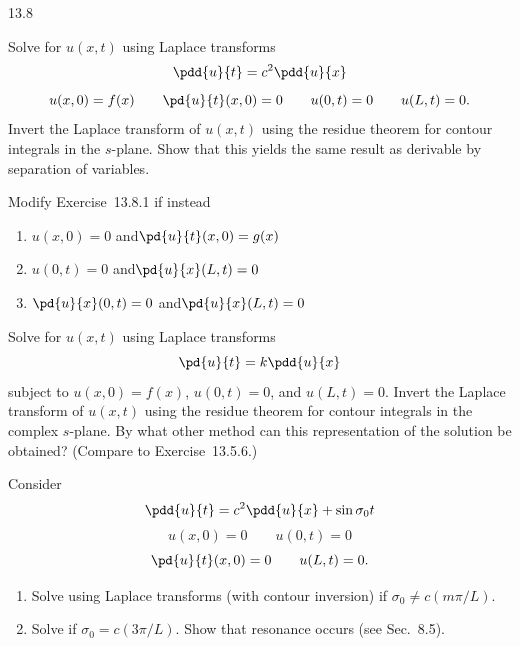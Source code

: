 \begin{exercises}{13.8}

\item[\starred 13.8.1.] Solve for $u(x,t)$ using Laplace transforms
\[
\pdd{u}{t} = c^2\pdd{u}{x}
\]
\[
u(x,0) = f(x) \qquad \pd{u}{t}(x,0) = 0 \qquad u(0,t) = 0 \qquad u(L,t) = 0.
\]
Invert the Laplace transform of $u(x,t)$ using the residue theorem for contour integrals in the $s$-plane.  Show that this yields the same result as derivable by separation of variables.

\item Modify Exercise~13.8.1 if instead
\begin{enumerate}
\item[(a)] $u(x,0) = 0$ \quad and\quad $\pd{u}{t}(x,0) = g(x)$
\item[(b)] $u(0,t) = 0$ \quad and\quad $\pd{u}{x}(L,t) = 0$
\item[(c)] $\pd{u}{x}(0,t) = 0$ \quad and\quad $\pd{u}{x}(L,t) = 0$
\end{enumerate}

\item Solve for $u(x,t)$ using Laplace transforms
\[
\pd{u}{t} = k\pdd{u}{x}
\]
subject to $u(x,0) = f(x)$, $u(0,t) = 0$, and $u(L,t) = 0$.
Invert the Laplace transform of $u(x,t)$ using the residue theorem for contour integrals in the complex $s$-plane.  By what other method can this representation of the solution be obtained?  (Compare to Exercise~13.5.6.)

\item Consider
\[
\pdd{u}{t} = c^2\pdd{u}{x} + \sin\sigma_0 t
\]
\[
u(x,0) = 0 \qquad u(0,t) = 0
\]
\[
\pd{u}{t}(x,0) = 0 \qquad u(L,t) = 0.
\]
\begin{enumerate}
\item[(a)] Solve using Laplace transforms (with contour inversion) if $\sigma_0 \ne c(m\pi/L)$.
\item[(b)] Solve if $\sigma_0 = c(3\pi/L)$.  Show that resonance occurs (see Sec.~8.5).
\end{enumerate}

\end{exercises}
